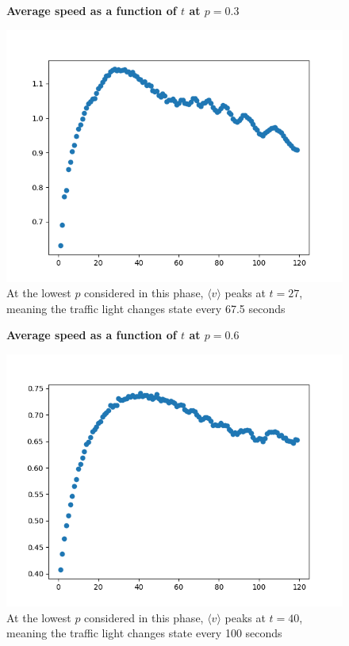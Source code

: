 \documentclass{article}
\begin{document}
\begin{figure}
\textbf{\large Average speed as a function of $t$ at $p=0.3$}\par\medskip
{}
\includegraphics[scale = 0.55, left]{./data/phase3/v_vs_t_p=0.3.png}
\vspace*{0.1cm}\hspace*{4.5cm}{\large $t$}
\caption{\label{fig} At the lowest $p$ considered in this phase, $\langle v \rangle$ peaks at $t=27$, meaning the traffic light changes state every 67.5 seconds}
\end{figure}

\begin{figure}
\textbf{\large Average speed as a function of $t$ at $p=0.6$}\par\medskip
{}
\includegraphics[scale = 0.55, left]{./data/phase3/v_vs_t_p=0.6.png}
\vspace*{0.1cm}\hspace*{4.5cm}{\large $t$}
\caption{\label{fig} At the lowest $p$ considered in this phase, $\langle v \rangle$ peaks at $t=40$, meaning the traffic light changes state every 100 seconds}
\end{figure}
\end{document}
